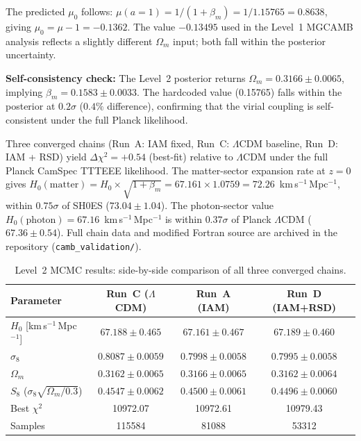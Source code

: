 \documentclass[11pt,letterpaper]{article}
\begin{document}
The predicted $\mu_0$ follows: $\mu(a{=}1) = 1/(1 + \beta_m) = 1/1.15765 = 0.8638$, giving $\mu_0 = \mu - 1 = -0.1362$. The value $-0.13495$ used in the Level~1 MGCAMB analysis reflects a slightly different $\Omega_m$ input; both fall within the posterior uncertainty.

\textbf{Self-consistency check:} The Level~2 posterior returns $\Omega_m = 0.3166 \pm 0.0065$, implying $\beta_m = 0.1583 \pm 0.0033$. The hardcoded value (0.15765) falls within the posterior at $0.2\sigma$ ($0.4\%$ difference), confirming that the virial coupling is self-consistent under the full Planck likelihood.

Three converged chains (Run~A: IAM fixed, Run~C: $\Lambda$CDM baseline, Run~D: IAM + RSD) yield $\Delta\chi^2 = +0.54$ (best-fit) relative to $\Lambda$CDM under the full Planck CamSpec TTTEEE likelihood. The matter-sector expansion rate at $z = 0$ gives $H_0(\mathrm{matter}) = H_0 \times \sqrt{1 + \beta_m} = 67.161 \times 1.0759 = 72.26$~km\,s$^{-1}$\,Mpc$^{-1}$, within $0.75\sigma$ of SH0ES ($73.04 \pm 1.04$). The photon-sector value $H_0(\mathrm{photon}) = 67.16$~km\,s$^{-1}$\,Mpc$^{-1}$ is within $0.37\sigma$ of Planck $\Lambda$CDM ($67.36 \pm 0.54$). Full chain data and modified Fortran source are archived in the repository (\texttt{camb\_validation/}).

\begin{table}[h]
\centering
\caption{Level~2 MCMC results: side-by-side comparison of all three converged chains.}
\label{tab:level2_sidebyside}
\begin{tabular}{lccc}
\toprule
Parameter & Run~C ($\Lambda$CDM) & Run~A (IAM) & Run~D (IAM+RSD) \\
\midrule
$H_0$ [km\,s$^{-1}$\,Mpc$^{-1}$] & $67.188 \pm 0.465$ & $67.161 \pm 0.467$ & $67.189 \pm 0.460$ \\
$\sigma_8$ & $0.8087 \pm 0.0059$ & $0.7998 \pm 0.0058$ & $0.7995 \pm 0.0058$ \\
$\Omega_m$ & $0.3162 \pm 0.0065$ & $0.3166 \pm 0.0065$ & $0.3162 \pm 0.0064$ \\
$S_8$ ($\sigma_8\sqrt{\Omega_m/0.3}$) & $0.4547 \pm 0.0062$ & $0.4500 \pm 0.0061$ & $0.4496 \pm 0.0060$ \\
Best $\chi^2$ & 10972.07 & 10972.61 & 10979.43 \\
Samples & 115584 & 81088 & 53312 \\
\bottomrule
\end{tabular}
\end{table}
\end{document}
